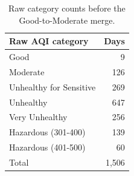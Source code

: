 \begin{table}[htbp]
\centering
\small
\caption{Raw category counts before the Good-to-Moderate merge.}
\label{tab:raw-counts}
\begin{tabular}{lr}
\toprule
Raw AQI category & Days \\
\midrule
Good & 9 \\
Moderate & 126 \\
Unhealthy for Sensitive & 269 \\
Unhealthy & 647 \\
Very Unhealthy & 256 \\
Hazardous (301-400) & 139 \\
Hazardous (401-500) & 60 \\
Total & 1,506 \\
\bottomrule
\end{tabular}

\end{table}
